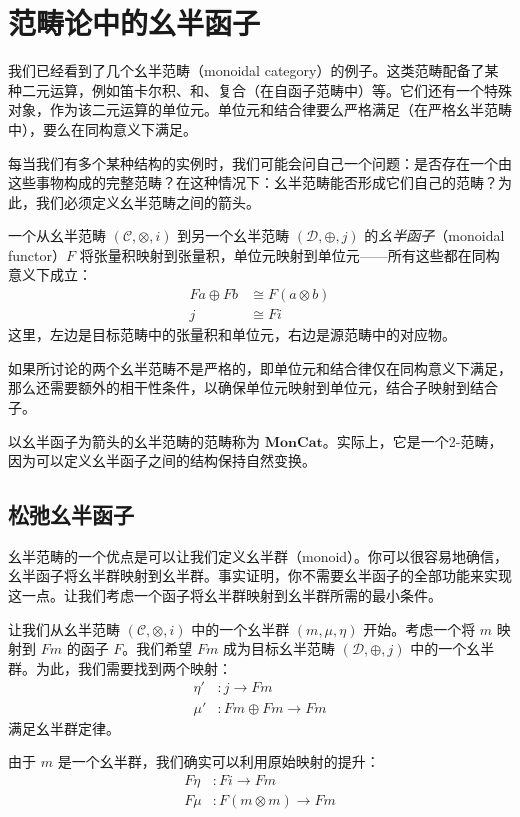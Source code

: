 \documentclass[DaoFP]{subfiles}
\begin{document}
\section{范畴论中的幺半函子}

我们已经看到了几个幺半范畴（monoidal category）的例子。这类范畴配备了某种二元运算，例如笛卡尔积、和、复合（在自函子范畴中）等。它们还有一个特殊对象，作为该二元运算的单位元。单位元和结合律要么严格满足（在严格幺半范畴中），要么在同构意义下满足。

每当我们有多个某种结构的实例时，我们可能会问自己一个问题：是否存在一个由这些事物构成的完整范畴？在这种情况下：幺半范畴能否形成它们自己的范畴？为此，我们必须定义幺半范畴之间的箭头。

一个从幺半范畴 $(\mathcal{C}, \otimes, i)$ 到另一个幺半范畴 $(\mathcal{D}, \oplus, j)$ 的\emph{幺半函子}（monoidal functor）$F$ 将张量积映射到张量积，单位元映射到单位元——所有这些都在同构意义下成立：
\begin{align*}
F a \oplus F b &\cong F (a \otimes b) \\
j &\cong F i 
\end{align*}
这里，左边是目标范畴中的张量积和单位元，右边是源范畴中的对应物。

如果所讨论的两个幺半范畴不是严格的，即单位元和结合律仅在同构意义下满足，那么还需要额外的相干性条件，以确保单位元映射到单位元，结合子映射到结合子。

以幺半函子为箭头的幺半范畴的范畴称为 $\mathbf{MonCat}$。实际上，它是一个2-范畴，因为可以定义幺半函子之间的结构保持自然变换。

\subsection{松弛幺半函子}

幺半范畴的一个优点是可以让我们定义幺半群（monoid）。你可以很容易地确信，幺半函子将幺半群映射到幺半群。事实证明，你不需要幺半函子的全部功能来实现这一点。让我们考虑一个函子将幺半群映射到幺半群所需的最小条件。

让我们从幺半范畴 $(\mathcal{C}, \otimes, i)$ 中的一个幺半群 $(m, \mu, \eta)$ 开始。考虑一个将 $m$ 映射到 $F m$ 的函子 $F$。我们希望 $F m$ 成为目标幺半范畴 $(\mathcal{D}, \oplus, j)$ 中的一个幺半群。为此，我们需要找到两个映射：
\begin{align*}
\eta' &\colon j \to F m \\
 \mu' &\colon F m \oplus F m \to F m 
\end{align*}
满足幺半群定律。

由于 $m$ 是一个幺半群，我们确实可以利用原始映射的提升：
\begin{align*}
 F \eta &\colon F i \to F m \\
 F \mu &\colon F (m \otimes m) \to F m
\end{align*}
\end{document}

